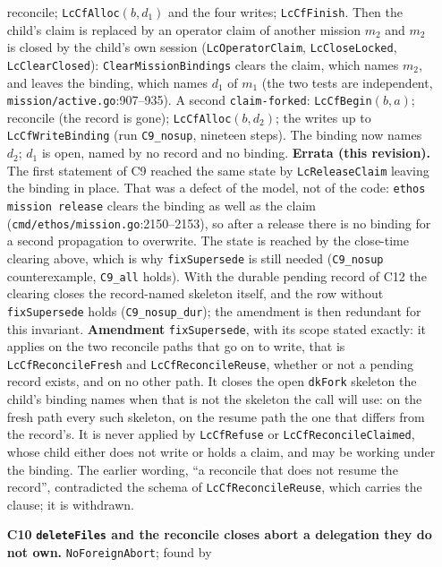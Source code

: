\documentclass[a4paper,10pt,fleqn]{article}
\newcommand{\fpath}[1]{\texttt{#1}}
\newcommand{\field}[1]{\texttt{#1}}
\begin{document}
\begin{enumerate}
    reconcile; \field{LcCfAlloc}$(b,d_1)$ and the four writes; \field{LcCfFinish}.
    Then the child's claim is replaced by an operator claim of another
    mission $m_2$ and $m_2$ is closed by the child's own session
    (\field{LcOperatorClaim}, \field{LcCloseLocked}, \field{LcClearClosed}):
    \field{ClearMissionBindings} clears the claim, which names $m_2$, and
    leaves the binding, which names $d_1$ of $m_1$ (the two tests are
    independent, \fpath{mission/active.go}:907--935). A second
    \field{claim-forked}: \field{LcCfBegin}$(b,a)$; reconcile (the record is
    gone); \field{LcCfAlloc}$(b,d_2)$; the writes up to
    \field{LcCfWriteBinding} (run \texttt{C9\_nosup}, nineteen steps). The
    binding now names $d_2$; $d_1$ is open, named by no record and no
    binding. \textbf{Errata (this revision).} The first statement of C9 reached
    the same state by \field{LcReleaseClaim} leaving the binding in place.
    That was a defect of the model, not of the code: \field{ethos mission
    release} clears the binding as well as the claim
    (\fpath{cmd/ethos/mission.go}:2150--2153), so after a release there is no
    binding for a second propagation to overwrite. The state is reached by
    the close-time clearing above, which is why \field{fixSupersede} is
    still needed (\texttt{C9\_nosup} counterexample, \texttt{C9\_all}
    holds). With the durable pending record of C12 the clearing closes the record-named skeleton itself, and the row without \field{fixSupersede} holds (\texttt{C9\_nosup\_dur}); the amendment is then redundant for this invariant. \textbf{Amendment} \field{fixSupersede}, with its scope stated
    exactly: it applies on the two reconcile paths that go on to write, that
    is \field{LcCfReconcileFresh} and \field{LcCfReconcileReuse}, whether or
    not a pending record exists, and on no other path. It closes the open
    \field{dkFork} skeleton the child's binding names when that is not the
    skeleton the call will use: on the fresh path every such skeleton, on the
    resume path the one that differs from the record's. It is never applied
    by \field{LcCfRefuse} or \field{LcCfReconcileClaimed}, whose child either
    does not write or holds a claim, and may be working under the binding. The
    earlier wording, ``a reconcile that does not resume the record'',
    contradicted the schema of \field{LcCfReconcileReuse}, which carries the
    clause; it is withdrawn.
  \item[\textbf{C10}] \textbf{\field{deleteFiles} and the reconcile closes
    abort a delegation they do not own.} \field{NoForeignAbort}; found by

\end{enumerate}
\end{document}
